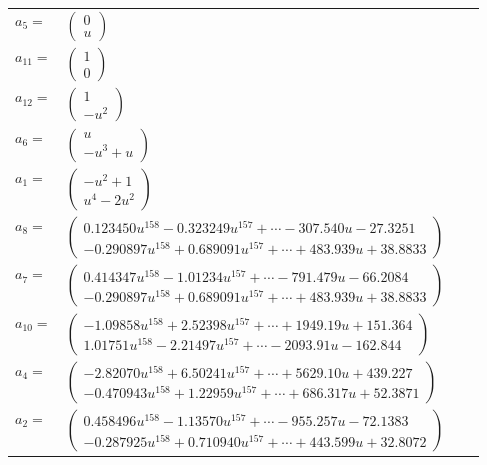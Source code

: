 \documentclass[1p]{elsarticle_modified}
\theoremstyle{definition}
\begin{document}
\begin{tabular}{m{7pt} m{180pt} m{7pt} m{180pt} }
\flushright $a_{5}=$&$\begin{pmatrix}0\\u\end{pmatrix}$ \\
\flushright $a_{11}=$&$\begin{pmatrix}1\\0\end{pmatrix}$ \\
\flushright $a_{12}=$&$\begin{pmatrix}1\\- u^2\end{pmatrix}$ \\
\flushright $a_{6}=$&$\begin{pmatrix}u\\- u^3+u\end{pmatrix}$ \\
\flushright $a_{1}=$&$\begin{pmatrix}- u^2+1\\u^4-2 u^2\end{pmatrix}$ \\
\flushright $a_{8}=$&$\begin{pmatrix}0.123450 u^{158}-0.323249 u^{157}+\cdots-307.540 u-27.3251\\-0.290897 u^{158}+0.689091 u^{157}+\cdots+483.939 u+38.8833\end{pmatrix}$ \\
\flushright $a_{7}=$&$\begin{pmatrix}0.414347 u^{158}-1.01234 u^{157}+\cdots-791.479 u-66.2084\\-0.290897 u^{158}+0.689091 u^{157}+\cdots+483.939 u+38.8833\end{pmatrix}$ \\
\flushright $a_{10}=$&$\begin{pmatrix}-1.09858 u^{158}+2.52398 u^{157}+\cdots+1949.19 u+151.364\\1.01751 u^{158}-2.21497 u^{157}+\cdots-2093.91 u-162.844\end{pmatrix}$ \\
\flushright $a_{4}=$&$\begin{pmatrix}-2.82070 u^{158}+6.50241 u^{157}+\cdots+5629.10 u+439.227\\-0.470943 u^{158}+1.22959 u^{157}+\cdots+686.317 u+52.3871\end{pmatrix}$ \\
\flushright $a_{2}=$&$\begin{pmatrix}0.458496 u^{158}-1.13570 u^{157}+\cdots-955.257 u-72.1383\\-0.287925 u^{158}+0.710940 u^{157}+\cdots+443.599 u+32.8072\end{pmatrix}$ \\

\end{tabular}
\end{document}
